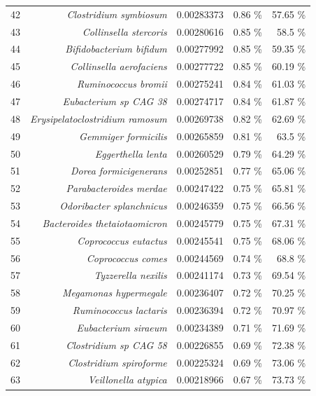 \documentclass{article}
\begin{document}
\begin{table}[h]
\begin{centering}
\begin{tabular}{|r|r|r|r|r|}
      42 & \textit{Clostridium symbiosum} & 0.00283373 & 0.86 \% & 57.65 \% \\
      43 & \textit{Collinsella stercoris} & 0.00280616 & 0.85 \% & 58.5 \% \\
      44 & \textit{Bifidobacterium bifidum} & 0.00277992 & 0.85 \% & 59.35 \% \\
      45 & \textit{Collinsella aerofaciens} & 0.00277722 & 0.85 \% & 60.19 \% \\
      46 & \textit{Ruminococcus bromii} & 0.00275241 & 0.84 \% & 61.03 \% \\
      47 & \textit{Eubacterium sp CAG 38} & 0.00274717 & 0.84 \% & 61.87 \% \\
      48 & \textit{Erysipelatoclostridium ramosum} & 0.00269738 & 0.82 \% & 62.69 \% \\
      49 & \textit{Gemmiger formicilis} & 0.00265859 & 0.81 \% & 63.5 \% \\
      50 & \textit{Eggerthella lenta} & 0.00260529 & 0.79 \% & 64.29 \% \\
      51 & \textit{Dorea formicigenerans} & 0.00252851 & 0.77 \% & 65.06 \% \\
      52 & \textit{Parabacteroides merdae} & 0.00247422 & 0.75 \% & 65.81 \% \\
      53 & \textit{Odoribacter splanchnicus} & 0.00246359 & 0.75 \% & 66.56 \% \\
      54 & \textit{Bacteroides thetaiotaomicron} & 0.00245779 & 0.75 \% & 67.31 \% \\
      55 & \textit{Coprococcus eutactus} & 0.00245541 & 0.75 \% & 68.06 \% \\
      56 & \textit{Coprococcus comes} & 0.00244569 & 0.74 \% & 68.8 \% \\
      57 & \textit{Tyzzerella nexilis} & 0.00241174 & 0.73 \% & 69.54 \% \\
      58 & \textit{Megamonas hypermegale} & 0.00236407 & 0.72 \% & 70.25 \% \\
      59 & \textit{Ruminococcus lactaris} & 0.00236394 & 0.72 \% & 70.97 \% \\
      60 & \textit{Eubacterium siraeum} & 0.00234389 & 0.71 \% & 71.69 \% \\
      61 & \textit{Clostridium sp CAG 58} & 0.00226855 & 0.69 \% & 72.38 \% \\
      62 & \textit{Clostridium spiroforme} & 0.00225324 & 0.69 \% & 73.06 \% \\
      63 & \textit{Veillonella atypica} & 0.00218966 & 0.67 \% & 73.73 \% \\

\end{tabular}
\end{centering}
\end{table}
\end{document}
